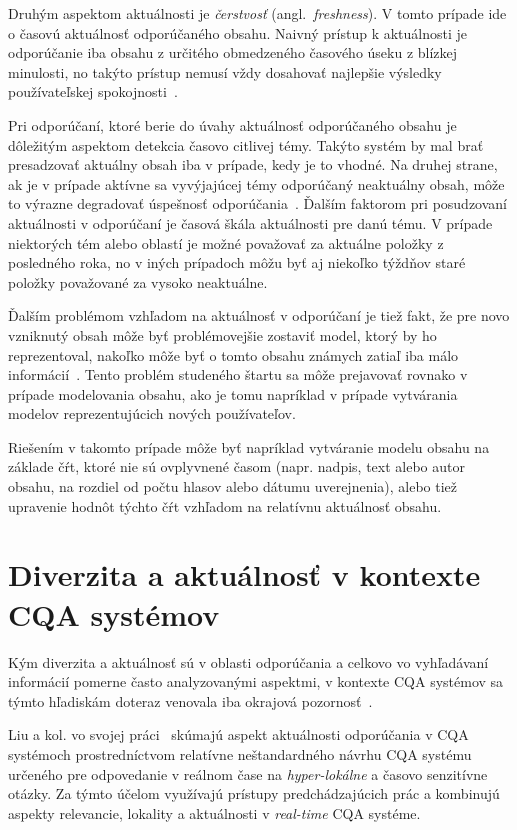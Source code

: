 Druhým aspektom aktuálnosti je \emph{čerstvosť} (angl.~\emph{freshness}). V tomto prípade ide o časovú aktuálnosť odporúčaného
obsahu. Naivný prístup k aktuálnosti je odporúčanie iba obsahu z určitého obmedzeného časového úseku z blízkej minulosti,
no takýto prístup nemusí vždy dosahovať najlepšie výsledky používateľskej spokojnosti~\cite{Szpektor2013}.

Pri odporúčaní, ktoré berie do úvahy aktuálnosť odporúčaného obsahu je dôležitým aspektom detekcia časovo citlivej témy.
Takýto systém by mal brať presadzovať aktuálny obsah iba v prípade, kedy je to vhodné. Na druhej strane, ak je v prípade
aktívne sa vyvýjajúcej témy odporúčaný neaktuálny obsah, môže to výrazne degradovať úspešnosť odporúčania~\cite{Dong2010}.
Ďalším faktorom pri posudzovaní aktuálnosti v odporúčaní je časová škála aktuálnosti pre danú tému.
V prípade niektorých tém alebo oblastí je možné považovať za aktuálne položky z posledného roka, no v iných prípadoch
môžu byť aj niekoľko týždňov staré položky považované za vysoko neaktuálne.

Ďalším problémom vzhľadom na aktuálnosť v odporúčaní je tiež fakt, že pre novo vzniknutý obsah môže byť problémovejšie
zostaviť model, ktorý by ho reprezentoval, nakoľko môže byť o tomto obsahu známych zatiaľ iba málo informácií~\cite{Dong2010TW}.
Tento problém studeného štartu sa môže prejavovať rovnako v prípade modelovania obsahu, ako je tomu napríklad v prípade
vytvárania modelov reprezentujúcich nových používateľov.

Riešením v takomto prípade môže byť napríklad vytváranie modelu
obsahu na základe čŕt, ktoré nie sú ovplyvnené časom (napr. nadpis, text alebo autor obsahu, na rozdiel od počtu hlasov
alebo dátumu uverejnenia), alebo tiež upravenie hodnôt týchto čŕt vzhľadom na relatívnu aktuálnosť obsahu.


\section{Diverzita a aktuálnosť v kontexte CQA systémov}

Kým diverzita a aktuálnosť sú v oblasti odporúčania a celkovo vo vyhľadávaní informácií pomerne často analyzovanými aspektmi,
v kontexte CQA systémov sa týmto hľadiskám doteraz venovala iba okrajová pozornosť~\cite{Srba2016}.

Liu a kol. vo svojej práci~\cite{Liu2015} skúmajú aspekt aktuálnosti odporúčania v CQA systémoch prostredníctvom
relatívne neštandardného návrhu CQA systému určeného pre odpovedanie v reálnom čase na \emph{hyper-lokálne} a časovo senzitívne
otázky. Za týmto účelom využívajú prístupy predchádzajúcich prác a kombinujú aspekty relevancie, lokality a aktuálnosti
v \emph{real-time} CQA systéme.



